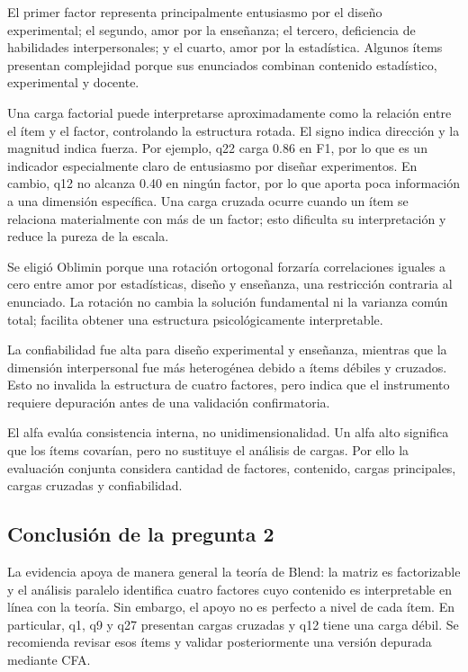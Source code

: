 \documentclass[11pt,letterpaper]{article}
\begin{document}
El primer factor representa principalmente entusiasmo por el diseño experimental; el segundo, amor por la enseñanza; el tercero, deficiencia de habilidades interpersonales; y el cuarto, amor por la estadística. Algunos ítems presentan complejidad porque sus enunciados combinan contenido estadístico, experimental y docente.

Una carga factorial puede interpretarse aproximadamente como la relación entre el ítem y el factor, controlando la estructura rotada. El signo indica dirección y la magnitud indica fuerza. Por ejemplo, q22 carga 0.86 en F1, por lo que es un indicador especialmente claro de entusiasmo por diseñar experimentos. En cambio, q12 no alcanza 0.40 en ningún factor, por lo que aporta poca información a una dimensión específica. Una carga cruzada ocurre cuando un ítem se relaciona materialmente con más de un factor; esto dificulta su interpretación y reduce la pureza de la escala.

Se eligió Oblimin porque una rotación ortogonal forzaría correlaciones iguales a cero entre amor por estadísticas, diseño y enseñanza, una restricción contraria al enunciado. La rotación no cambia la solución fundamental ni la varianza común total; facilita obtener una estructura psicológicamente interpretable.

La confiabilidad fue alta para diseño experimental y enseñanza, mientras que la dimensión interpersonal fue más heterogénea debido a ítems débiles y cruzados. Esto no invalida la estructura de cuatro factores, pero indica que el instrumento requiere depuración antes de una validación confirmatoria.

El alfa evalúa consistencia interna, no unidimensionalidad. Un alfa alto significa que los ítems covarían, pero no sustituye el análisis de cargas. Por ello la evaluación conjunta considera cantidad de factores, contenido, cargas principales, cargas cruzadas y confiabilidad.

\subsection{Conclusión de la pregunta 2}

La evidencia apoya de manera general la teoría de Blend: la matriz es factorizable y el análisis paralelo identifica cuatro factores cuyo contenido es interpretable en línea con la teoría. Sin embargo, el apoyo no es perfecto a nivel de cada ítem. En particular, q1, q9 y q27 presentan cargas cruzadas y q12 tiene una carga débil. Se recomienda revisar esos ítems y validar posteriormente una versión depurada mediante CFA.
\end{document}
